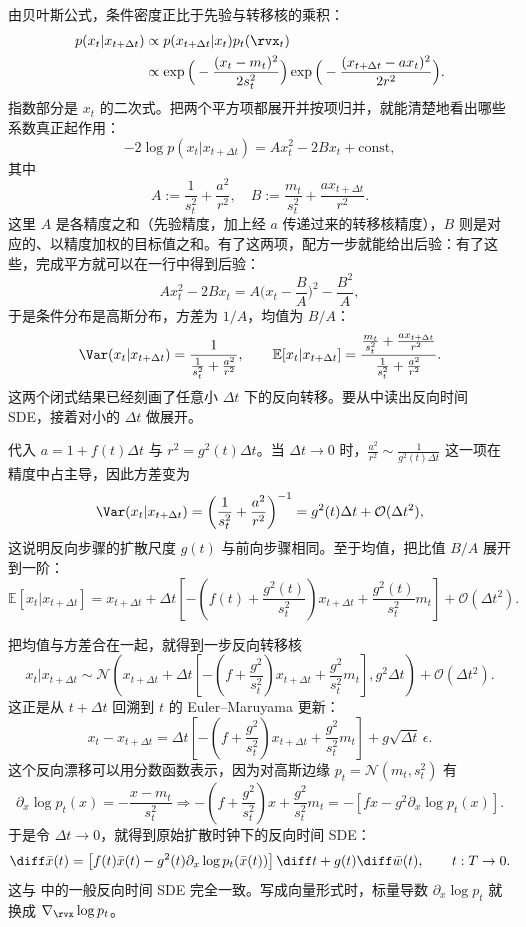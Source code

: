 由贝叶斯公式，条件密度正比于先验与转移核的乘积：
\begin{align*}
    p(x_t   |   x_{t+\Delta t})  &\propto p(x_{t+\Delta t} | x_t   ) p_t(\rvx_t) \\&\propto
\exp\Big(-\frac{(x_t-m_t)^2}{2s_t^2}\Big)
\exp\Big(-\frac{(x_{t+\Delta t}-a  x_t)^2}{2r^2}\Big).
\end{align*}
指数部分是 $x_t$ 的二次式。把两个平方项都展开并按项归并，就能清楚地看出哪些系数真正起作用：
\[
-2\log p(x_t   |   x_{t+\Delta t})
 =
A  x_t^2  -  2 B  x_t  +  \text{const},
\]
其中
\[
A:=\frac{1}{s_t^2}+\frac{a^2}{r^2},\quad
B:=\frac{m_t}{s_t^2}+\frac{a  x_{t+\Delta t}}{r^2}.
\]
这里 $A$ 是各精度之和（先验精度，加上经 $a$ 传递过来的转移核精度），$B$ 则是对应的、以精度加权的目标值之和。有了这两项，配方一步就能给出后验：有了这些，完成平方就可以在一行中得到后验：
\[
A x_t^2 - 2 B x_t
  =
A\Big(x_t-\frac{B}{A}\Big)^2  -  \frac{B^2}{A},
\]
于是条件分布是高斯分布，方差为 $1/A$，均值为 $B/A$：
\[
\Var(x_t   |   x_{t+\Delta t})   =   \frac{1}{\frac{1}{s_t^2}+\frac{a^2}{r^2}},
\qquad
\mathbb E[x_t   |   x_{t+\Delta t}]   =
\frac{\frac{m_t}{s_t^2}+\frac{a  x_{t+\Delta t}}{r^2}}{\frac{1}{s_t^2}+\frac{a^2}{r^2}}.
\]
这两个闭式结果已经刻画了任意小 $\Delta t$ 下的反向转移。要从中读出反向时间 SDE，接着对小的 $\Delta t$ 做展开。

代入 $a=1+f(t)\Delta t$ 与 $r^2=g^2(t)\Delta t$。当 $\Delta t\to 0$ 时，$\frac{a^2}{r^2}\sim \frac{1}{g^2(t)\Delta t}$ 这一项在精度中占主导，因此方差变为
\[
\Var(x_t   |   x_{t+\Delta t})
= \left(\frac{1}{s_t^2}+\frac{a^2}{r^2}\right)^{-1}
= g^2(t)  \Delta t  +  \mathcal{O}(\Delta t^2),
\]
这说明反向步骤的扩散尺度 $g(t)$ 与前向步骤相同。至于均值，把比值 $B/A$ 展开到一阶：
\[
\mathbb E[x_t   |   x_{t+\Delta t}]
  =  x_{t+\Delta t}
 +  \Delta t\left[
-\left(f(t)+\frac{g^2(t)}{s_t^2}\right)  x_{t+\Delta t}
 +  \frac{g^2(t)}{s_t^2}  m_t
\right]  +  \mathcal{O}(\Delta t^2).
\]

把均值与方差合在一起，就得到一步反向转移核
\[
x_t    |    x_{t+\Delta t}
 \sim
\mathcal N\!\left(
x_{t+\Delta t} + \Delta t\!\left[-\left(f+\frac{g^2}{s_t^2}\right)  x_{t+\Delta t} + \frac{g^2}{s_t^2}  m_t\right],
 g^2  \Delta t\right)
 +  \mathcal{O}(\Delta t^2).
\]
这正是从 $t+\Delta t$ 回溯到 $t$ 的 Euler--Maruyama 更新：
\[
x_t - x_{t+\Delta t}
= \Delta t\!\left[-\left(f+\frac{g^2}{s_t^2}\right) x_{t+\Delta t}
+ \frac{g^2}{s_t^2} m_t\right]
+ g\sqrt{\Delta t}\,\epsilon.
\]
这个反向漂移可以用分数函数表示，因为对高斯边缘 $p_t=\mathcal N(m_t,s_t^2)$ 有
\[
\partial_x \log p_t(x) = -\frac{x-m_t}{s_t^2}
 \Longrightarrow
-\left(f+\frac{g^2}{s_t^2}\right)x
+\frac{g^2}{s_t^2}m_t
=
-\left[f x-g^2\partial_x\log p_t(x)\right].
\]
于是令 $\Delta t\to0$，就得到原始扩散时钟下的反向时间 SDE：
\[
\diff \bar x(t)
=
\left[
f(t)\bar x(t)
-
g^2(t)\partial_x\log p_t(\bar x(t))
\right]\diff t
+
g(t)\diff\bar w(t),
\qquad t:T\to0.
\]
这与  中的一般反向时间 SDE 完全一致。写成向量形式时，标量导数 $\partial_x\log p_t$ 就换成 $\nabla_{\rvx}\log p_t$。

